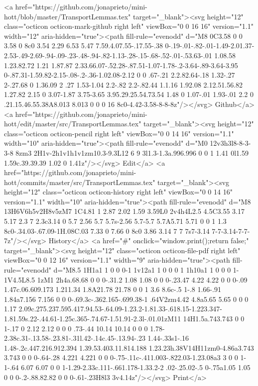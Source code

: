 {{{      <a href="https://github.com/jonaprieto/mini-hott/blob/master/TransportLemmas.tex" target="_blank"><svg height="12" class="octicon octicon-mark-github right left" viewBox="0 0 16 16" version="1.1" width="12" aria-hidden="true"><path fill-rule="evenodd" d="M8 0C3.58 0 0 3.58 0 8c0 3.54 2.29 6.53 5.47 7.59.4.07.55-.17.55-.38 0-.19-.01-.82-.01-1.49-2.01.37-2.53-.49-2.69-.94-.09-.23-.48-.94-.82-1.13-.28-.15-.68-.52-.01-.53.63-.01 1.08.58 1.23.82.72 1.21 1.87.87 2.33.66.07-.52.28-.87.51-1.07-1.78-.2-3.64-.89-3.64-3.95 0-.87.31-1.59.82-2.15-.08-.2-.36-1.02.08-2.12 0 0 .67-.21 2.2.82.64-.18 1.32-.27 2-.27.68 0 1.36.09 2 .27 1.53-1.04 2.2-.82 2.2-.82.44 1.1.16 1.92.08 2.12.51.56.82 1.27.82 2.15 0 3.07-1.87 3.75-3.65 3.95.29.25.54.73.54 1.48 0 1.07-.01 1.93-.01 2.2 0 .21.15.46.55.38A8.013 8.013 0 0 0 16 8c0-4.42-3.58-8-8-8z"/></svg> Github</a>
      <a href="https://github.com/jonaprieto/mini-hott/edit/master/src/TransportLemmas.tex" target="_blank"><svg height="12" class="octicon octicon-pencil right left" viewBox="0 0 14 16" version="1.1" width="10" aria-hidden="true"><path fill-rule="evenodd" d="M0 12v3h3l8-8-3-3-8 8zm3 2H1v-2h1v1h1v1zm10.3-9.3L12 6 9 3l1.3-1.3a.996.996 0 0 1 1.41 0l1.59 1.59c.39.39.39 1.02 0 1.41z"/></svg> Edit</a>
      <a href="https://github.com/jonaprieto/mini-hott/commits/master/src/TransportLemmas.tex" target="_blank"><svg height="12" class="octicon octicon-history right left" viewBox="0 0 14 16" version="1.1" width="10" aria-hidden="true"><path fill-rule="evenodd" d="M8 13H6V6h5v2H8v5zM7 1C4.81 1 2.87 2.02 1.59 3.59L0 2v4h4L2.5 4.5C3.55 3.17 5.17 2.3 7 2.3c3.14 0 5.7 2.56 5.7 5.7s-2.56 5.7-5.7 5.7A5.71 5.71 0 0 1 1.3 8c0-.34.03-.67.09-1H.08C.03 7.33 0 7.66 0 8c0 3.86 3.14 7 7 7s7-3.14 7-7-3.14-7-7-7z"/></svg> History</a>
      <a  href="#" onclick="window.print();return false;" target="_blank"><svg height="12" class="octicon octicon-file-pdf right left" viewBox="0 0 12 16" version="1.1" width="9" aria-hidden="true"><path fill-rule="evenodd" d="M8.5 1H1a1 1 0 0 0-1 1v12a1 1 0 0 0 1 1h10a1 1 0 0 0 1-1V4.5L8.5 1zM1 2h4a.68.68 0 0 0-.31.2 1.08 1.08 0 0 0-.23.47 4.22 4.22 0 0 0-.09 1.47c.06.609.173 1.211.34 1.8A21.78 21.78 0 0 1 3.6 8.6c-.5 1-.8 1.66-.91 1.84a7.156 7.156 0 0 0-.69.3c-.362.165-.699.38-1 .64V2zm4.42 4.8a5.65 5.65 0 0 0 1.17 2.09c.275.237.595.417.94.53-.64.09-1.23.2-1.81.33-.618.15-1.223.347-1.81.59s.22-.44.61-1.25c.365-.74.67-1.51.91-2.3l-.01.01zM11 14H1.5a.743.743 0 0 1-.17 0 2.12 2.12 0 0 0 .73-.44 10.14 10.14 0 0 0 1.78-2.38c.31-.13.58-.23.81-.31l.42-.14c.45-.13.94-.23 1.44-.33s1-.16 1.48-.2c.447.216.912.394 1.39.53.403.11.814.188 1.23.23h.38V14H11zm0-4.86a3.743 3.743 0 0 0-.64-.28 4.221 4.221 0 0 0-.75-.11c-.411.003-.822.03-1.23.08a3 3 0 0 1-1-.64 6.07 6.07 0 0 1-1.29-2.33c.111-.661.178-1.33.2-2 .02-.25.02-.5 0-.75a1.05 1.05 0 0 0-.2-.88.82.82 0 0 0-.61-.23H8l3 3v4.14z"/></svg> Print</a>
}}}
